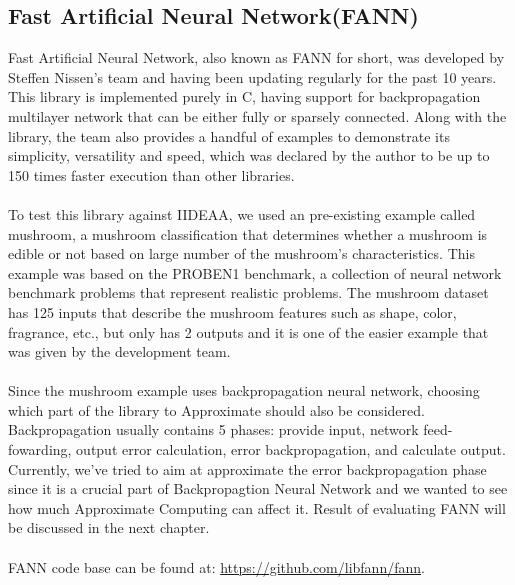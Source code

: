\subsection{Fast Artificial Neural Network(FANN)}

Fast Artificial Neural Network\cite{fann}, also known as FANN for short, was developed by Steffen Nissen's team and having been updating regularly for the past 10 years. This library is implemented purely in C, having support for backpropagation multilayer network that can be either fully or sparsely connected. Along with the library, the team also provides a handful of examples to demonstrate its simplicity, versatility and speed, which was declared by the author to be up to 150 times faster execution than other libraries. \\
~\\
To test this library against IIDEAA, we used an pre-existing example called mushroom, a mushroom classification that determines whether a mushroom is edible or not based on large number of the mushroom's characteristics. This example was based on the PROBEN1 benchmark, a collection of neural network benchmark problems that represent realistic problems. The mushroom dataset has 125 inputs that describe the mushroom features such as shape, color, fragrance, etc., but only has 2 outputs and it is one of the easier example that was given by the development team. \\
~\\
Since the mushroom example uses backpropagation neural network, choosing which part of the library to Approximate should also be considered. Backpropagation usually contains 5 phases: provide input, network feed-fowarding, output error calculation, error backpropagation, and calculate output. Currently, we've tried to aim at approximate the error backpropagation phase since it is a crucial part of Backpropagtion Neural Network and we wanted to see how much Approximate Computing can affect it. Result of evaluating FANN will be discussed in the next chapter.\\
~\\
FANN code base can be found at: \url{https://github.com/libfann/fann}.\\